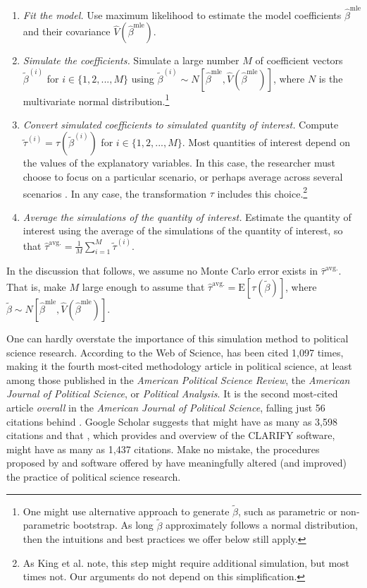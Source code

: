 \documentclass[10pt]{article}
\begin{document}
\begin{enumerate}
\item \textit{Fit the model.} 
Use maximum likelihood to estimate the model coefficients $\hat{\beta}^{\text{mle}}$ and their covariance $\hat{V} \left( \hat{\beta}^{\text{mle}} \right)$.
\item \textit{Simulate the coefficients.} 
Simulate a large number $M$ of coefficient vectors $\tilde{\beta}^{(i)}$ for $i \in \{1, 2, ... , M\}$ using $\tilde{\beta}^{(i)} \sim N \left[ \hat{\beta}^{\text{mle}}, \hat{V} \left( \hat{\beta}^{\text{mle}} \right) \right]$, where $N$ is the multivariate normal distribution.\footnote{One might use alternative approach to generate $\tilde{\beta}$, such as parametric or non-parametric bootstrap. As long $\tilde{\beta}$ approximately follows a normal distribution, then the intuitions and best practices we offer below still apply.}
\item \textit{Convert simulated coefficients to simulated quantity of interest.} 
Compute $\tilde{\tau}^{(i)} = \tau \left( \tilde{\beta}^{(i)} \right)$ for $i \in \{1, 2, ... , M\}$. 
Most quantities of interest depend on the values of the explanatory variables. 
In this case, the researcher must choose to focus on a particular scenario, or perhaps average across several scenarios \citep{HanmerKalkan2013}. 
In any case, the transformation $\tau$ includes this choice.\footnote{As King et al. note, this step might require additional simulation, but most times not. Our arguments do not depend on this simplification.}
\item \textit{Average the simulations of the quantity of interest.} 
Estimate the quantity of interest using the average of the simulations of the quantity of interest, so that $\hat{\tau}^{\text{avg.}} = \frac{1}{M} \sum_{i = 1}^{M} \tilde{\tau}^{(i)}$.
\end{enumerate}
In the discussion that follows, we assume no Monte Carlo error exists in $\hat{\tau}^{\text{avg.}}$. 
That is, make $M$ large enough to assume that $\hat{\tau}^{\text{avg.}} = \text{E}\left[ \tau \left(\tilde{\beta} \right) \right]$, where $\tilde{\beta} \sim N \left[ \hat{\beta}^{\text{mle}}, \hat{V} \left( \hat{\beta}^{\text{mle}} \right) \right]$. 

One can hardly overstate the importance of this simulation method to political science research. 
According to the Web of Science, \cite{KingTomzWittenberg2000} has been cited 1,097 times, making it the fourth most-cited methodology article in political science, at least among those published in the \textit{American Political Science Review}, the \textit{American Journal of Political Science}, or \textit{Political Analysis}. 
It is the second most-cited article \textit{overall} in the \textit{American Journal of Political Science}, falling just 56 citations behind \cite{BeckKatzTucker1998}.
Google Scholar suggests that \cite{KingTomzWittenberg2000} might have as many as 3,598 citations and that \cite{TomzWittenbergKing2003}, which provides and overview of the CLARIFY software, might have as many as 1,437 citations.
Make no mistake, the procedures proposed by \cite{KingTomzWittenberg2000} and software offered by \cite{TomzWittenbergKing2003} have meaningfully altered (and improved) the practice of political science research. 
\end{document}
